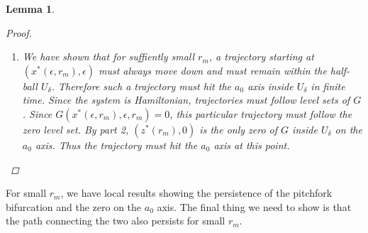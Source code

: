 \documentclass[12pt]{article}
\newtheorem{lemma}{Lemma}
\begin{document}
\begin{lemma}
\begin{proof}
\begin{enumerate}
\item We have shown that for suffiently small $r_m$, a trajectory starting at $(x^*(\epsilon, r_m), \epsilon)$ must always move down and must remain within the half-ball $U_\delta$. Therefore such a trajectory must hit the $a_0$ axis inside $U_\delta$ in finite time. Since the system is Hamiltonian, trajectories must follow level sets of $G$. Since $G(x^*(\epsilon, r_m), \epsilon, r_m) = 0$, this particular trajectory must follow the zero level set. By part 2, $(z^*(r_m), 0)$ is the only zero of $G$ inside $U_\delta$ on the $a_0$ axis. Thus the trajectory must hit the $a_0$ axis at this point.
\end{enumerate}

\end{proof}
\end{lemma}

For small $r_m$, we have local results showing the persistence of the pitchfork bifurcation and the zero on the $a_0$ axis. The final thing we need to show is that the path connecting the two also persists for small $r_m$.

\end{document}
